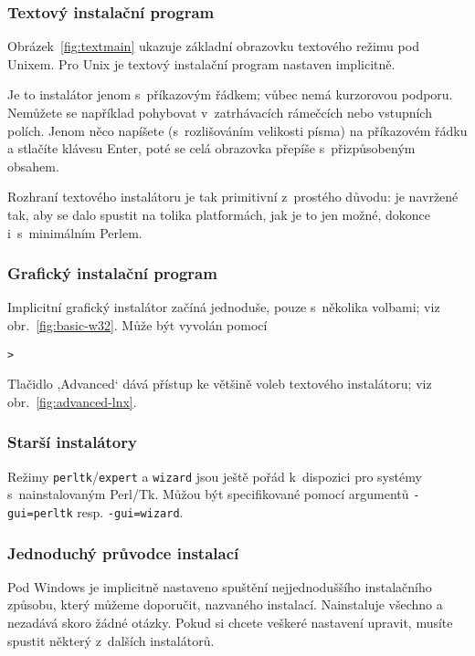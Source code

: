 \documentclass[\classoptions,slovak,english,czech]{\classname}
\newcommand{\singleuv}[1]{,#1`}
\begin{document}
\subsubsection{Textový instalační program}

Obrázek~\ref{fig:textmain} ukazuje základní obrazovku textového režimu pod Unixem.
Pro Unix je textový instalační program nastaven implicitně.

Je to instalátor jenom s~příkazovým řádkem; vůbec nemá kurzorovou podporu.
Nemůžete se například pohybovat v~zatrhávacích rámečcích nebo vstupních polích. 
Jenom něco napíšete (s~rozlišováním velikosti písma) na příkazovém řádku a 
stlačíte klávesu Enter, poté se celá obrazovka přepíše s~přizpůsobeným obsahem.

Rozhraní textového instalátoru je tak primitivní z~prostého důvodu: je
navržené tak, aby se dalo spustit na tolika platformách, jak je to jen
možné, dokonce i~s~minimálním Perlem.

\subsubsection{Grafický instalační program}
\label{sec:graphical-inst}

Implicitní grafický instalátor začíná jednoduše, pouze s~několika
volbami; viz obr.~\ref{fig:basic-w32}.
Může být vyvolán pomocí
\begin{alltt}
	> 
\end{alltt}
Tlačidlo \singleuv{Advanced} dává přístup ke většině voleb textového
instalátoru; viz obr.~\ref{fig:advanced-lnx}.

\subsubsection{Starší instalátory}

Režimy \texttt{perltk}/\texttt{expert} a \texttt{wizard} jsou ještě pořád 
k~dispozici pro systémy s~nainstalovaným Perl/Tk. Můžou být specifikované 
pomocí argumentů \texttt{-gui=perltk} resp. \texttt{-gui=wizard}.


\subsubsection{Jednoduchý průvodce instalací}

Pod Windows je implicitně nastaveno spuštění nejjednoduššího 
instalačního způsobu, který můžeme doporučit, 
nazvaného  instalací. %
Nainstaluje všechno a nezadává skoro žádné otázky. Pokud si 
chcete veškeré nastavení upravit, musíte spustit některý 
z~dalších instalátorů.
\end{document}
